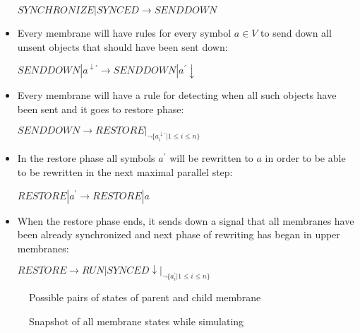 \begin{dokaz}
\begin{itemize}
    $SYNCHRONIZE|SYNCED \rightarrow SENDDOWN$

    \item Every membrane will have rules for every symbol $a\in V$ to send down all unsent objects that should have been sent down:

    $SENDDOWN|a^{\downarrow\prime} \rightarrow SENDDOWN|a^{\prime}\downarrow$

    \item Every membrane will have a rule for detecting when all such objects have been sent and it goes to restore phase:

    $SENDDOWN \rightarrow RESTORE|_{\neg \{a_i^{\downarrow\prime}|1\leq i\leq n\}}$

    \item In the restore phase all symbols $a^{\prime}$ will be rewritten to $a$ in order to be able to be rewritten in the next maximal parallel step:

    $RESTORE|a^{\prime} \rightarrow RESTORE|a$

    \item When the restore phase ends, it sends down a signal that all membranes have been already synchronized and next phase of rewriting has began in upper membranes:

    $RESTORE \rightarrow RUN|SYNCED\downarrow|_{\neg \{a_i^{\prime}|1\leq i\leq n\}}$
  \end{itemize}

  \providecommand{\narrow}[1]{\scalebox{.85}[1.0]{#1}}

  \begin{figure}
    \def\svgwidth{\textwidth}
    
    \caption{Possible pairs of states of parent and child membrane}
    \label{fig:possible_pairs_of_states_of_parent_and_child_membrane}
  \end{figure}

  \begin{figure}
    \def\svgwidth{\textwidth}
    
    \caption{Snapshot of all membrane states while simulating}
    \label{fig:snapshot_of_all_membrane_states_while_simulating}
  \end{figure}


\end{dokaz}
